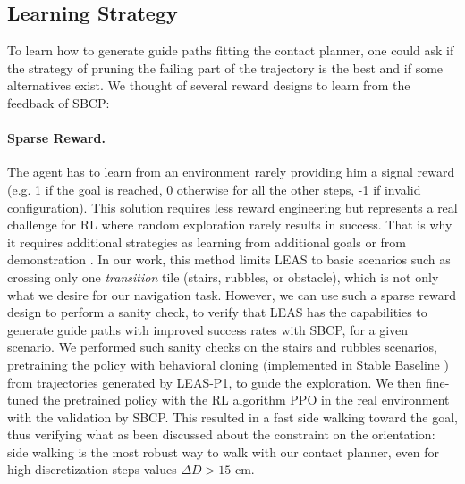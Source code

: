 \subsection{Learning Strategy}
To learn how to generate guide paths fitting the contact planner, one could ask if the strategy of pruning the failing part of the trajectory is the best and if some alternatives exist.
We thought of several reward designs to learn from the feedback of SBCP:
\paragraph{Sparse Reward.} 
The agent has to learn from an environment rarely providing him a signal reward (e.g. 1 if the goal is reached, 0 otherwise for all the other steps, -1 if invalid configuration). 
This solution requires less reward engineering but represents a real challenge for RL where random exploration rarely results in success. That is why it requires additional strategies as learning from additional goals \cite{HER,sparse_heess} or from demonstration \cite{DDPGfd, pretraining_BC, meta_learning_from_demo}. 
In our work, this method limits LEAS to basic scenarios such as crossing only one \textit{transition} tile (stairs, rubbles, or obstacle), which is not only what we desire for our navigation task.
However, we can use such a sparse reward design to perform a sanity check, to verify that LEAS has the capabilities to generate guide paths with improved success rates with SBCP, for a given scenario.
We performed such sanity checks on the stairs and rubbles scenarios, pretraining the policy with behavioral cloning (implemented in Stable Baseline \cite{stable-baselines}) from trajectories generated by LEAS-P1, to guide the exploration. We then fine-tuned the pretrained policy with the RL algorithm PPO in the real environment with the validation by SBCP. This resulted in a fast side walking toward the goal, thus verifying what as been discussed about the constraint on the orientation: side walking is the most robust way to walk with our contact planner, even for high discretization steps values $\Delta D>15$ cm.
